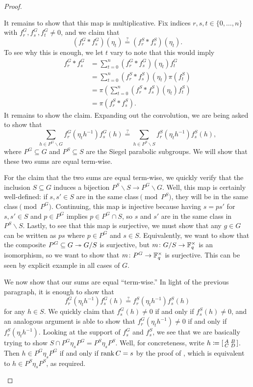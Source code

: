 \begin{proof}
\begin{itemize}
        It remains to show that this map is multiplicative. Fix indices $r,s,t\in\{0,\ldots,n\}$ with $f_r^G,f_s^G,f_t^G\ne0$, and we claim that
        \[\left(f_r^G*f_s^G\right)(\eta_t)\stackrel?=\left(f_r^S*f_s^S\right)(\eta_t).\]
        To see why this is enough, we let $t$ vary to note that this would imply
        \begin{align*}
            f_r^G*f_s^G &= \sum_{t=0}^n\left(f_r^G*f_s^G\right)(\eta_t)f_t^G \\
            &= \sum_{t=0}^n\left(f_r^S*f_s^S\right)(\eta_t)\pi\left(f_t^S\right) \\
            &= \pi\left(\sum_{t=0}^n\left(f_r^S*f_s^S\right)(\eta_t)f_t^S\right) \\
            &= \pi\left(f_r^S*f_s^S\right).
        \end{align*}
        It remains to show the claim. Expanding out the convolution, we are being asked to show that
        \[\sum_{h\in P^G\backslash G}f_r^G\left(\eta_th^{-1}\right)f_s^G(h)\stackrel?=\sum_{h\in P^S\backslash S}f_r^S\left(\eta_th^{-1}\right)f_s^S(h),\]
        where $P^G\subseteq G$ and $P^S\subseteq S$ are the Siegel parabolic subgroups. We will show that these two sums are equal term-wise.

        For the claim that the two sums are equal term-wise, we quickly verify that the inclusion $S\subseteq G$ induces a bijection $P^S\backslash S\to P^G\backslash G$. Well, this map is certainly well-defined: if $s,s'\in S$ are in the same class$\pmod{P^S}$, they will be in the same class$\pmod{P^G}$. Continuing, this map is injective because having $s=ps'$ for $s,s'\in S$ and $p\in P^G$ implies $p\in P^G\cap S$, so $s$ and $s'$ are in the same class in $P^S\backslash S$. Lastly, to see that this map is surjective, we must show that any $g\in G$ can be written as $ps$ where $p\in P^G$ and $s\in S$. Equivalently, we want to show that the composite $P^G\subseteq G\twoheadrightarrow G/S$ is surjective, but $m\colon G/S\to\mathbb F_q^\times$ is an isomorphism, so we want to show that $m\colon P^G\to\mathbb F_q^\times$ is surjective. This can be seen by explicit example in all cases of $G$.

        We now show that our sums are equal ``term-wise.'' In light of the previous paragraph, it is enough to show that
        \[f_r^G\left(\eta_th^{-1}\right)f_s^G(h)\stackrel?=f_r^S\left(\eta_th^{-1}\right)f_s^S(h)\]
        for any $h\in S$. We quickly claim that $f_s^G(h)\ne0$ if and only if $f_s^S(h)\ne0$, and an analogous argument is able to show that $f_r^G\left(\eta_th^{-1}\right)\ne0$ if and only if $f_r^S\left(\eta_th^{-1}\right)$. Looking at the support of $f_s^G$ and $f_s^S$, we see that we are basically trying to show $S\cap P^G\eta_sP^G=P^S\eta_sP^S$. Well, for concreteness, write $h\coloneqq\begin{bsmallmatrix}
            A & B \\ C & D
        \end{bsmallmatrix}$. Then $h\in P^G\eta_sP^G$ if and only if $\operatorname{rank}C=s$ by the proof of , which is equivalent to $h\in P^S\eta_sP^S$, as required.


\end{itemize}
\end{proof}
